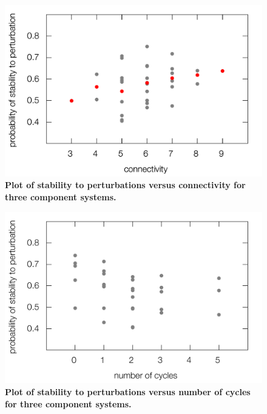 \begin{figure}[!ht]
\centering
\noindent\includegraphics[width=0.8\columnwidth]{fig/stab3x3.pdf}
\caption{{\bf Plot of stability to perturbations versus connectivity for three component systems.} }
\label{fig:stab3x3}
\end{figure}

\begin{figure}[!ht]
\centering
\noindent\includegraphics[width=0.8\columnwidth]{fig/cycle3x3.pdf}
\caption{{\bf Plot of stability to perturbations versus number of cycles for three component systems.} }
\label{fig:cycle3x3}
\end{figure}
